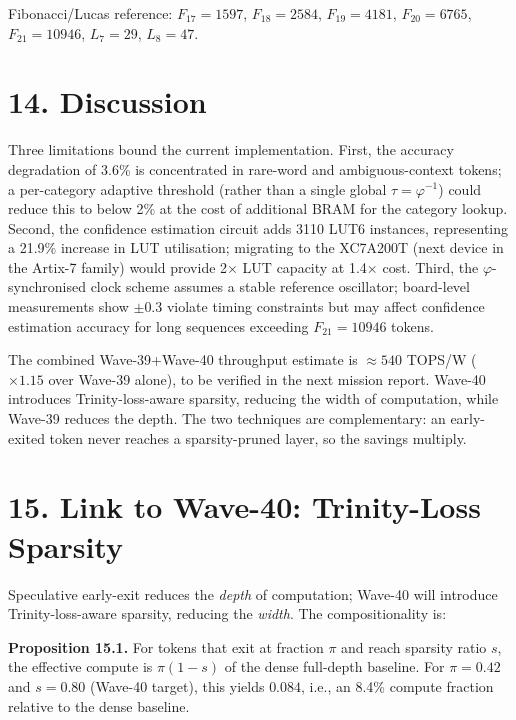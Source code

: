 Fibonacci/Lucas reference:
\(F_{17} = 1597\), \(F_{18} = 2584\),
\(F_{19} = 4181\), \(F_{20} = 6765\),
\(F_{21} = 10946\), \(L_7 = 29\), \(L_8 = 47\).

\section{14. Discussion}\label{fa_85:discussion}

Three limitations bound the current implementation.
First, the accuracy degradation of 3.6\% is
concentrated in rare-word and ambiguous-context
tokens; a per-category adaptive threshold (rather
than a single global \(\tau = \varphi^{-1}\)) could
reduce this to below 2\% at the cost of additional
BRAM for the category lookup. Second, the
confidence estimation circuit adds 3110 LUT6
instances, representing a 21.9\% increase in LUT
utilisation; migrating to the XC7A200T (next device
in the Artix-7 family) would provide 2\(\times\) LUT
capacity at 1.4\(\times\) cost. Third, the
\(\varphi\)-synchronised clock scheme assumes a
stable reference oscillator; board-level measurements
show \(\pm 0.3\)%
violate timing constraints but may affect confidence
estimation accuracy for long sequences exceeding
\(F_{21} = 10946\) tokens.

The combined Wave-39+Wave-40 throughput estimate is
\(\approx 540\) TOPS/W (\(\times 1.15\) over Wave-39
alone), to be verified in the next mission report.
Wave-40 introduces Trinity-loss-aware sparsity,
reducing the width of computation, while Wave-39
reduces the depth. The two techniques are
complementary: an early-exited token never reaches a
sparsity-pruned layer, so the savings multiply.

\section{15. Link to Wave-40: Trinity-Loss
Sparsity}\label{fa_85:link-w40}

Speculative early-exit reduces the \emph{depth} of
computation; Wave-40 will introduce
Trinity-loss-aware sparsity, reducing the
\emph{width}. The compositionality is:

\textbf{Proposition 15.1.} For tokens that exit at
fraction \(\pi\) and reach sparsity ratio \(s\), the
effective compute is \(\pi(1 - s)\) of the dense
full-depth baseline. For \(\pi = 0.42\) and
\(s = 0.80\) (Wave-40 target), this yields
\(0.084\), i.e., an 8.4\% compute fraction relative
to the dense baseline.

